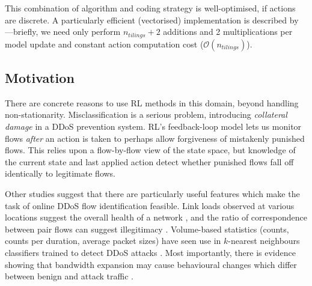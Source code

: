 \documentclass[10pt, times, conference, letterpaper]{IEEEtran}
\begin{document}
This combination of algorithm and coding strategy is well-optimised, if actions are discrete.
A particularly efficient (vectorised) implementation is described by \textcite{RL2E}---briefly, we need only perform $n_{\mathit{tilings}} + 2$ additions and \num{2} multiplications per model update and constant action computation cost ($\mathcal{O}(n_{\mathit{tilings}})$).

\subsection{Motivation}\label{sec:motivation}
There are concrete reasons to use RL methods in this domain, beyond handling non-stationarity.
Misclassification is a serious problem, introducing \emph{collateral damage} in a DDoS prevention system.
RL's feedback-loop model lets us monitor flows \emph{after} an action is taken to perhaps allow forgiveness of mistakenly punished flows.
This relies upon a flow-by-flow view of the state space, but knowledge of the current state and last applied action detect whether punished flows fall off identically to legitimate flows.

Other studies suggest that there are particularly useful features which make the task of online DDoS flow identification feasible.
Link loads observed at various locations suggest the overall health of a network \cite{DBLP:journals/eaai/MalialisK15}, and the ratio of correspondence between pair flows can suggest illegitimacy \cite{DBLP:conf/ndss/Rossow14}.
Volume-based statistics (counts, counts per duration, average packet sizes) have seen use in $k$-nearest neighbours classifiers trained to detect DDoS attacks \cite{DBLP:conf/dsn/LeeKSPY17}.
Most importantly, there is evidence showing that bandwidth expansion may cause behavioural changes which differ between benign and attack traffic \cite{DBLP:conf/ndss/KangGS16}.
\end{document}
